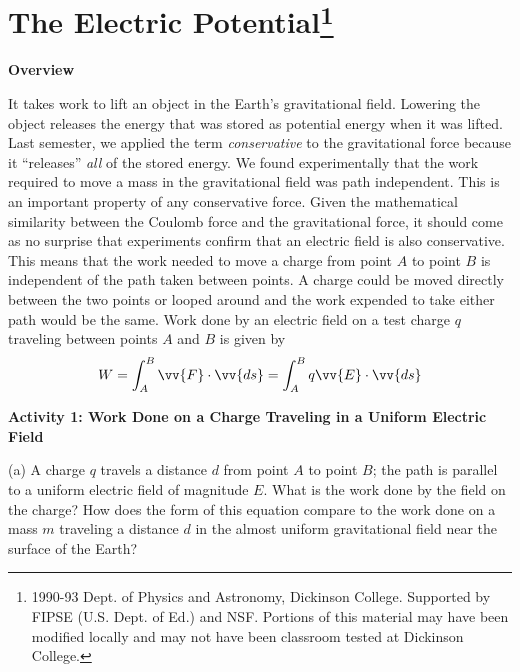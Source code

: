 
\section{The Electric Potential\footnote{%
1990-93 Dept. of Physics and Astronomy, Dickinson College. Supported
by FIPSE (U.S. Dept. of Ed.) and NSF. Portions of this material may
have been modified locally and may not have been classroom tested
at Dickinson College.
}}

\makelabheader %

\bigskip
\textbf{Overview}

It takes work to lift an object in the Earth's gravitational field.
Lowering the object releases the energy that was stored as potential
energy when it was lifted. Last semester, we applied the term \emph{conservative}
to the gravitational force because it {}``releases'' \emph{all}
of the stored energy. We found experimentally that the work required
to move a mass in the gravitational field was path independent. This
is an important property of any conservative force. Given the mathematical
similarity between the Coulomb force and the gravitational force,
it should come as no surprise that experiments confirm that an electric
field is also conservative. This means that the work needed to move
a charge from point $A$ to point $B$ is independent of the path taken
between points. A charge could be moved directly between the two points
or looped around and the work expended to take either path would be
the same. Work done by an electric field on a test charge $q$ traveling
between points $A$ and $B$ is given by
\begin{equation*}
W=\int ^{B}_{A}  \vv{F}\cdot \vv{ds}=\int ^{B}_{A}q\vv{E}\cdot \vv{ds} 
\end{equation*}

\bigskip
\textbf{Activity 1: Work Done on a Charge Traveling in a Uniform Electric
Field}

(a) A charge $q$ travels a distance $d$ from point $A$ to point $B$; the path
is parallel to a uniform electric field of magnitude $E$. What is the
work done by the field on the charge? How does the form of this equation
compare to the work done on a mass $m$ traveling a distance $d$ in the
almost uniform gravitational field near the surface of the Earth?

